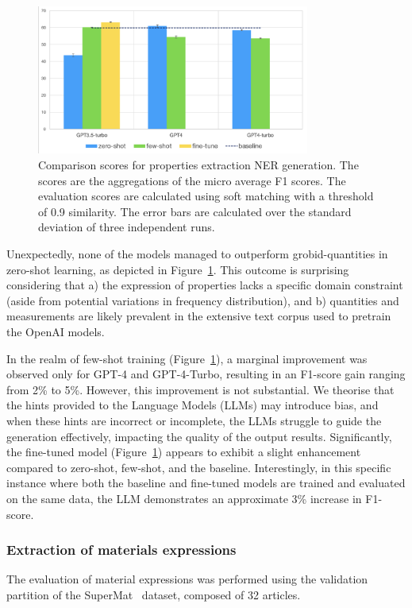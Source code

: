 \documentclass[a4paper]{article}
\begin{document}
\begin{figure}[htbp]
  \centering
  \includegraphics[width=0.8\textwidth]{figures/ner-measeval-all.png} 
  \caption{Comparison scores for properties extraction NER generation. The scores are the aggregations of the micro average F1 scores. The evaluation scores are calculated using soft matching with a threshold of 0.9 similarity. The error bars are calculated over the standard deviation of three independent runs.}
  \label{fig:ner-measeval-all}
\end{figure}

Unexpectedly, none of the models managed to outperform grobid-quantities in zero-shot learning, as depicted in Figure~\ref{fig:ner-measeval-all}. This outcome is surprising considering that a) the expression of properties lacks a specific domain constraint (aside from potential variations in frequency distribution), and b) quantities and measurements are likely prevalent in the extensive text corpus used to pretrain the OpenAI models.

In the realm of few-shot training (Figure~\ref{fig:ner-measeval-all}), a marginal improvement was observed only for GPT-4 and GPT-4-Turbo, resulting in an F1-score gain ranging from 2\% to 5\%. 
However, this improvement is not substantial. 
We theorise that the hints provided to the Language Models (LLMs) may introduce bias, and when these hints are incorrect or incomplete, the LLMs struggle to guide the generation effectively, impacting the quality of the output results.
Significantly, the fine-tuned model (Figure~\ref{fig:ner-measeval-all}) appears to exhibit a slight enhancement compared to zero-shot, few-shot, and the baseline. Interestingly, in this specific instance where both the baseline and fine-tuned models are trained and evaluated on the same data, the LLM demonstrates an approximate 3\% increase in F1-score.

\subsubsection{Extraction of materials expressions}
\label{sec:results-ner-materials}
The evaluation of material expressions was performed using the validation partition of the SuperMat~\cite{lfoppiano2021supermat} dataset, composed of 32 articles.
\end{document}
